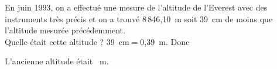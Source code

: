 En juin 1993, on a effectué une mesure de l'altitude de l'Everest
avec des instruments très précis et on a trouvé 8\,846,10~m soit
39~cm de moins que l'altitude mesurée précédemment.
\\Quelle était cette altitude ?
39~cm$=$0,39~m. Donc
\par
{}\kern2cm L'ancienne
altitude était ~m.
